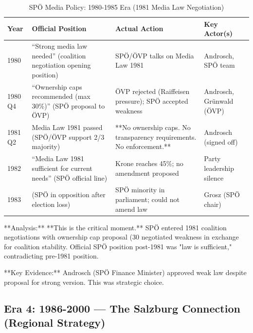 \begin{table}[h]
\centering
\small
\caption{SPÖ Media Policy: 1980-1985 Era (1981 Media Law Negotiation)}
\label{tab:bh-media-policy-1980-1985}
\begin{tabular}{|p{2.5cm}|p{3cm}|p{3cm}|p{4cm}|}
\hline
\textbf{Year} & \textbf{Official Position} & \textbf{Actual Action} & \textbf{Key Actor(s)} \\
\hline
1980 & ``Strong media law needed'' (coalition negotiation opening position) & SPÖ/ÖVP talks on Media Law 1981 & Androsch, SPÖ team \\
\hline
1980 Q4 & ``Ownership caps recommended (max 30\%)'' (SPÖ proposal to ÖVP) & ÖVP rejected (Raiffeisen pressure); SPÖ accepted weakness & Androsch, Grünwald (ÖVP) \\
\hline
1981 Q2 & Media Law 1981 passed (SPÖ/ÖVP support 2/3 majority) & **No ownership caps. No transparency requirements. No enforcement.** & Androsch (signed off) \\
\hline
1982 & ``Media Law 1981 sufficient for current needs'' (SPÖ official line) & Krone reaches 45\%; no amendment proposed & Party leadership silence \\
\hline
1983 & (SPÖ in opposition after election loss) & SPÖ minority in parliament; could not amend law & Grosz (SPÖ chair) \\
\hline
\end{tabular}
\end{table}

**Analysis:** **This is the critical moment.** SPÖ entered 1981 coalition negotiations with ownership cap proposal
(30%
negotiated weakness in exchange for coalition stability. Official SPÖ position post-1981 was "law is sufficient,"
contradicting pre-1981 position.

**Key Evidence:** Androsch (SPÖ Finance Minister) approved weak law despite proposal for strong version. This was strategic choice.

\subsection*{Era 4: 1986-2000 --- The Salzburg Connection (Regional Strategy)}


